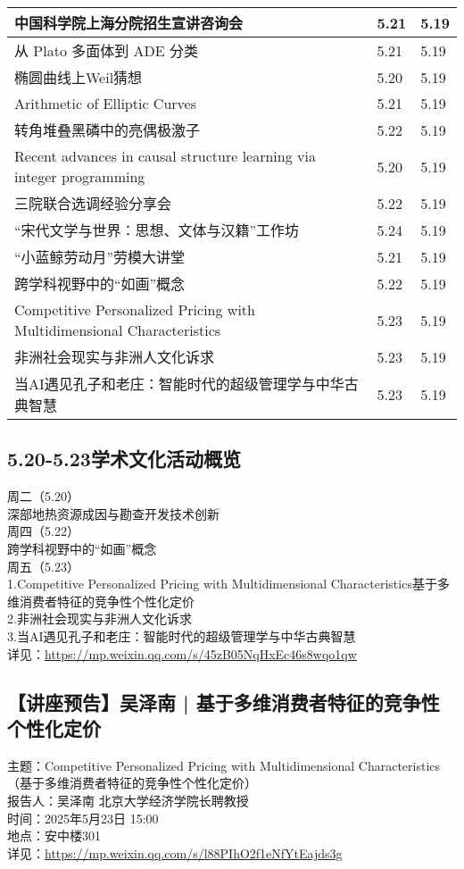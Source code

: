 \documentclass[letterpaper, 12pt]{article}
\begin{document}
\begin{multicols}{2}
\begin{tabular}{|>{\centering\arraybackslash}m{}|m{}|m{}|}
     中国科学院上海分院招生宣讲咨询会 & 5.21 & 5.19\\\hline
     从 Plato 多面体到 ADE 分类 & 5.21 & 5.19\\\hline
     椭圆曲线上Weil猜想 & 5.20 & 5.19\\\hline
     Arithmetic of Elliptic Curves & 5.21 & 5.19\\\hline
     转角堆叠黑磷中的亮偶极激子 & 5.22 & 5.19\\\hline
     Recent advances in causal structure learning via integer programming & 5.20 & 5.19\\\hline
     三院联合选调经验分享会 & 5.22 & 5.19\\\hline
     “宋代文学与世界：思想、文体与汉籍”工作坊 & 5.24 & 5.19\\\hline
     “小蓝鲸劳动月”劳模大讲堂 & 5.21 & 5.19\\\hline
     跨学科视野中的“如画”概念 & 5.22 & 5.19\\\hline
     Competitive Personalized Pricing with Multidimensional Characteristics & 5.23 & 5.19\\\hline
     非洲社会现实与非洲人文化诉求 & 5.23 & 5.19\\\hline
     当AI遇见孔子和老庄：智能时代的超级管理学与中华古典智慧 & 5.23 & 5.19\\\hline
    \end{tabular}
\subsection{5.20-5.23学术文化活动概览} %
周二（5.20）
\\深部地热资源成因与勘查开发技术创新
\\周四（5.22）
\\跨学科视野中的“如画”概念
\\周五（5.23）
\\1.Competitive Personalized Pricing with Multidimensional Characteristics基于多维消费者特征的竞争性个性化定价
\\2.非洲社会现实与非洲人文化诉求
\\3.当AI遇见孔子和老庄：智能时代的超级管理学与中华古典智慧
\\详见：\url{https://mp.weixin.qq.com/s/45zB05NqHxEc46s8wqo1qw}
\subsection{【讲座预告】吴泽南 | 基于多维消费者特征的竞争性个性化定价} %
主题：Competitive Personalized Pricing with Multidimensional Characteristics（基于多维消费者特征的竞争性个性化定价）
\\报告人：吴泽南 北京大学经济学院长聘教授
\\时间：2025年5月23日 15:00
\\地点：安中楼301
\\详见：\url{https://mp.weixin.qq.com/s/l88PIhO2f1eNfYtEajds3g}


\end{multicols}
\end{document}
